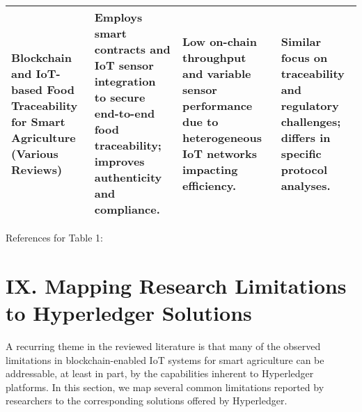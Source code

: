 \documentclass[12pt,onecolumn]{IEEEtran} %
\begin{document}
\begin{table}[H]
\begin{tabularx}{\textwidth}{lXXX}
\midrule
Blockchain and IoT-based Food Traceability for Smart Agriculture (Various Reviews) \cite{demestichas2020blockchaininagriculture} & Employs smart contracts and IoT sensor integration to secure end-to-end food traceability; improves authenticity and compliance. & Low on-chain throughput and variable sensor performance due to heterogeneous IoT networks impacting efficiency. & Similar focus on traceability and regulatory challenges; differs in specific protocol analyses. \\
\bottomrule
\end{tabularx}
\end{table}

References for Table 1: \cite{aliyu2023blockchainbasedsmartfarm, ali2022blockchainenabledarchitecture, demestichas2020blockchaininagriculture, bosona2023theroleof, khan2022ablockchainand}

\section*{IX. Mapping Research Limitations to Hyperledger Solutions}

A recurring theme in the reviewed literature is that many of the observed limitations in blockchain-enabled IoT systems for smart agriculture can be addressable, at least in part, by the capabilities inherent to Hyperledger platforms. In this section, we map several common limitations reported by researchers to the corresponding solutions offered by Hyperledger.
\end{document}
